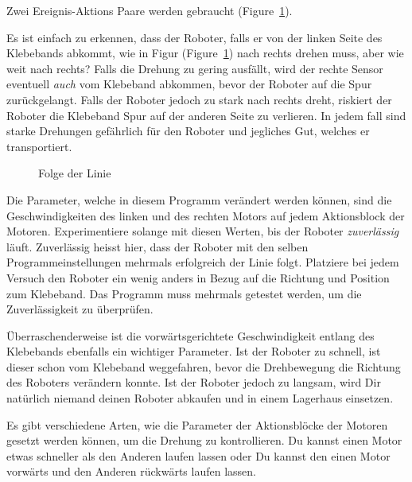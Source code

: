 Zwei Ereignis-Aktions Paare werden gebraucht  (Figure~\ref{fig.follow-line}).


Es ist einfach zu erkennen,
dass der Roboter, falls er von der linken Seite des Klebebands abkommt,
wie in Figur (Figure~\ref{fig.follow-line}) nach rechts drehen muss,
aber wie weit nach rechts? Falls die Drehung zu gering ausfällt,
wird der rechte Sensor eventuell \emph{auch} vom Klebeband abkommen,
bevor der Roboter auf die Spur zurückgelangt.
Falls der Roboter jedoch zu stark nach rechts dreht,
riskiert der Roboter die Klebeband Spur auf der anderen Seite zu verlieren.
In jedem fall sind starke Drehungen gefährlich für den Roboter und jegliches Gut,
welches er transportiert.


\begin{figure}
\begin{center}
\caption{Folge der Linie}
\label{fig.follow-line}
\end{center}
\end{figure}

Die Parameter, welche in diesem Programm verändert werden können,
sind die Geschwindigkeiten des linken und des rechten Motors auf jedem Aktionsblock der Motoren.
Experimentiere solange mit diesen Werten,
bis der Roboter \emph{zuverlässig} läuft.
Zuverlässig heisst hier, dass der Roboter mit den selben Programmeinstellungen mehrmals erfolgreich der Linie folgt.
Platziere bei jedem Versuch den Roboter ein wenig anders in Bezug auf die Richtung und Position zum Klebeband.
Das Programm muss mehrmals getestet werden, um die Zuverlässigkeit zu überprüfen.

Überraschenderweise ist die vorwärtsgerichtete Geschwindigkeit entlang des Klebebands ebenfalls ein wichtiger Parameter. 
Ist der Roboter zu schnell,
ist dieser schon vom Klebeband weggefahren,
bevor die Drehbewegung die Richtung des Roboters verändern konnte.
Ist der Roboter jedoch zu langsam, wird Dir natürlich  niemand deinen Roboter abkaufen
und in einem Lagerhaus einsetzen.

Es gibt verschiedene Arten,
wie die Parameter der Aktionsblöcke der Motoren gesetzt werden können,
um die  Drehung zu kontrollieren.
Du kannst einen Motor etwas schneller als den Anderen laufen lassen
oder Du kannst den einen Motor vorwärts und den Anderen rückwärts laufen lassen.

